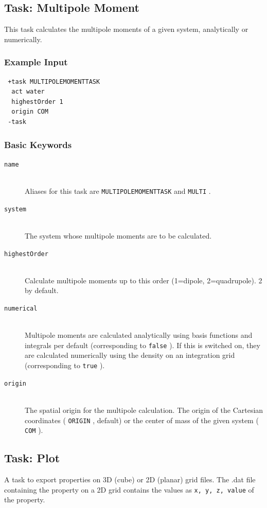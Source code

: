 \documentclass[bibliography=totocnumbered,a4paper,10pt,oneside]{scrbook}
\newcommand{\ttt}[1]{%
  \begingroup\setlength{\fboxsep}{1pt}%
  \colorbox{serenity-green!30}{\texttt{\hspace*{2pt}\vphantom{(g}#1\hspace*{2pt}}}%
  \endgroup
}
\begin{document}
\subsection{Task: Multipole Moment}
This task calculates the multipole moments of a given system, analytically or numerically.
\subsubsection{Example Input}
\begin{lstlisting}
 +task MULTIPOLEMOMENTTASK
  act water
  highestOrder 1
  origin COM
 -task
\end{lstlisting}

\subsubsection{Basic Keywords}
\begin{description}
\item [\texttt{name}]\hfill \\
  Aliases for this task are \ttt{MULTIPOLEMOMENTTASK} and \ttt{MULTI}.
\item [\texttt{system}]\hfill \\
  The system whose multipole moments are to be calculated.
\item [\texttt{highestOrder}]\hfill \\
Calculate multipole moments up to this order (1=dipole, 2=quadrupole). 2 by default.
\item [\texttt{numerical}]\hfill \\
Multipole moments are calculated analytically using basis functions
and integrals per default (corresponding to \ttt{false}). If this is switched on,
they are calculated numerically using the density on an integration grid (corresponding to \ttt{true}).
\item [\texttt{origin}]\hfill \\
The spatial origin for the multipole calculation.
The origin of the Cartesian coordinates (\ttt{ORIGIN}, default) or the center
of mass of the given system (\ttt{COM}).
\end{description}


\subsection{Task: Plot}
A task to export properties on 3D (cube) or 2D (planar) grid files. The .dat file containing the property on
a 2D grid contains the values as \ttt{x, y, z, value} of the property.
\end{document}

